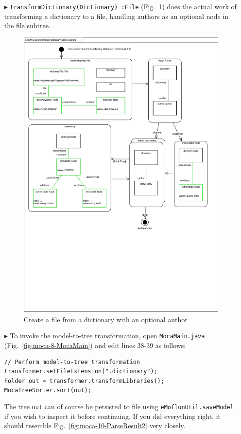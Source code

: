 \begin{enumerate}
\item[$\blacktriangleright$] \texttt{transformDictionary(Dictionary)~:File} (Fig.~\ref{fig:moca-transformDictionary}) does the actual work of transforming a dictionary to a file, handling authors as an optional node in the file subtree.
\begin{figure}[!htbp]
\begin{center}
 \includegraphics[width=\textwidth]{pics/moca/4ModelToMocaTree/transformDictionary}
  \caption{Create a file from a dictionary with an optional author} 
  \label{fig:moca-transformDictionary}
\end{center}
\end{figure} 
\item[$\blacktriangleright$] To invoke the model-to-tree transformation, open \texttt{MocaMain.java} (Fig.~\ref{fig:moca-8-MocaMain}) and edit lines 38-39 as follows:
\begin{verbatim}
// Perform model-to-tree transformation
transformer.setFileExtension(".dictionary");
Folder out = transformer.transformLibraries();
MocaTreeSorter.sort(out);
\end{verbatim}
The tree \texttt{out} can of course be persisted to file using \texttt{eMoflonUtil.saveModel} if you wish to inspect it before continuing.
If you did everything right, it should resemble Fig.~\ref{fig:moca-10-ParseResult2} very closely. 
\end{enumerate}